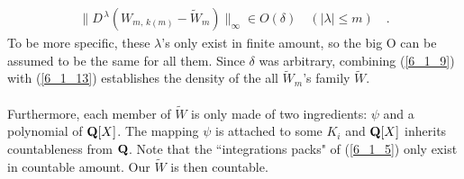 \begin{align}\label{6_1_13}
 \| D^{\,\lambda} (W_{m,\, k(\!m)} - \tilde{W}_m ) \|_\infty  \in O(\delta)\quad (\lvert \lambda \rvert\leq m) \quad   . 
\end{align}
To be more specific, these $\lambda$'s only exist in finite  amount, so the big O can be assumed to be the same for all them. Since $\delta$ was arbitrary, combining  (\ref{6_1_9}) with (\ref{6_1_13}) establishes the density of the all $\tilde{W}_m$'s family $\tilde{W}$.\\
\\
Furthermore, each member of $\tilde{W}$ is only made of two ingredients: $\psi$ and a polynomial of ${\mathbf Q}[X]$. The mapping $\psi$ is attached to some $K_i$ and ${\mathbf Q}[X]$ inherits countableness from ${\mathbf Q}$. Note that the ``integrations packs" of (\ref{6_1_5}) only exist in countable amount. Our $\tilde{W}$ is then countable.\QED












